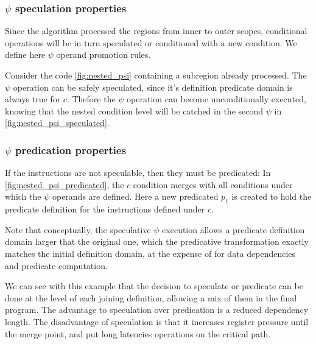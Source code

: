 \subsubsection{$\psi$ speculation properties}

Since the algorithm processed the regions from inner to outer scopes, conditional operations will be in turn speculated or conditioned with a new condition. We define here $\psi$ operand promotion rules.

Consider the code \ref{fig:nested_psi} containing a subregion already processed. The $\psi$ operation can be safely speculated, since it's definition predicate domain is always true for $c$. Thefore the $\psi$ operation can become unconditionally executed, knowing that the nested condition level will be catched in the second $\psi$ in \ref{fig:nested_psi_speculated}.

\subsubsection{$\psi$ predication properties}

If the instructions are not speculable, then they must be predicated:
In \ref{fig:nested_psi_predicated}, the $c$ condition merges with all conditions under which the $\psi$ operands are defined. Here a new predicated $p_1$ is created to hold the predicate definition for the instructions defined under $c$. 

Note that conceptually, the speculative $\psi$ execution allows a predicate definition domain larger that the original one, which the predicative transformation exactly matches the initial definition domain, at the expense of for data dependencies and predicate computation.

We can see with this example that the decision to speculate or predicate can be done at the level of each joining definition, allowing a mix of them in the final program. The advantage to speculation over predication is a reduced dependency length. The disadvantage of speculation is that it increases register pressure until the merge point, and put long latencies operations on the critical path.
 
